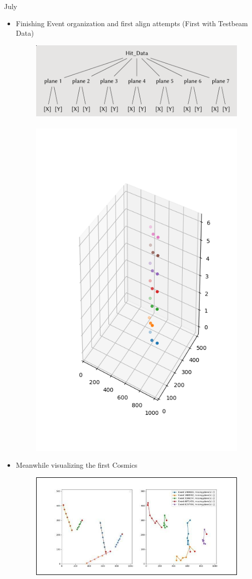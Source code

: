 \documentclass{beamer}
\begin{document}
\begin{frame}{July}
    \begin{itemize}
	\item Finishing Event organization and first align attempts
	    (First with Testbeam Data)
	    \begin{figure}[H]
		\centering
		\includegraphics[width=.4\textwidth]{MauriceEventOrg.png}
		\
		\includegraphics[width=.15\textwidth]{MauriceFirstAlign.png}
	    \end{figure}
	\item Meanwhile visualizing the first Cosmics
	    \begin{figure}[H]
		\centering
		\includegraphics[width=.4\textwidth]{DavidFirstVisual.jpg}
	    \end{figure}
    \end{itemize}
\end{frame}
\end{document}
